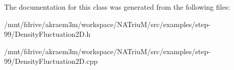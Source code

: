 The documentation for this class was generated from the following files:\begin{DoxyCompactItemize}
\item 
/mnt/fdrive/akraem3m/workspace/NATriuM/src/examples/step-\/99/DensityFluctuation2D.h\item 
/mnt/fdrive/akraem3m/workspace/NATriuM/src/examples/step-\/99/DensityFluctuation2D.cpp\end{DoxyCompactItemize}
